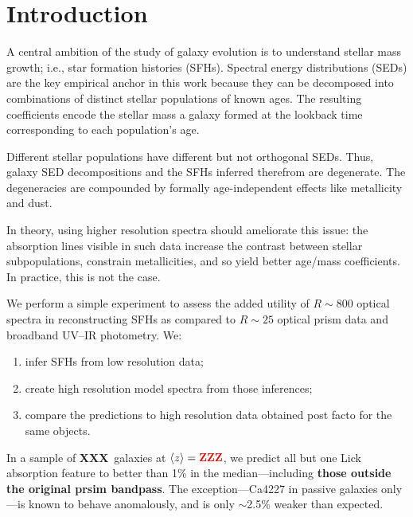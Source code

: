 \documentclass[a4paper,fleqn,usenatbib]{mnras}
\newcommand{\bfr}{\bf\color{red}}
\newcommand{\benum}{\begin{enumerate}}
\newcommand{\eenum}{\end{enumerate}}
\newcommand{\ntot}{{\bfr XXX}} %
\newcommand{\midz}{{\bfr ZZZ}} %
\begin{document}

\section{Introduction}
\label{sec:intro}

A central ambition of the study of galaxy evolution is to understand stellar mass growth; i.e., 
star formation histories (SFHs). Spectral energy distributions (SEDs) are the key empirical anchor 
in this work because they can be decomposed into combinations of distinct stellar populations of 
known ages. The resulting coefficients encode the stellar mass a galaxy formed at the lookback time 
corresponding to each population's age.
	
Different stellar populations have different but not orthogonal SEDs. Thus, galaxy SED decompositions 
and the SFHs inferred therefrom are degenerate. The degeneracies are compounded by 
formally age-independent effects like metallicity and dust. 

In theory, using higher resolution spectra should ameliorate this issue: the absorption lines visible 
in such data increase the contrast between stellar subpopulations, constrain metallicities, and so yield 
better age/mass coefficients. In practice, this is not the case.


We perform a simple experiment to assess the added utility of $R\sim800$ optical spectra in 
reconstructing SFHs as compared to $R\sim25$ optical prism data and broadband UV--IR photometry. 
We:
\benum
	\item infer SFHs from low resolution data;
	\item create high resolution model spectra from those inferences;
	\item compare the predictions to high resolution data obtained post facto for the same
		objects. 
\eenum

In a sample of \ntot\ galaxies at $\langle z\rangle=\midz$, we predict all but one Lick absorption 
feature \citep{Worthey94} to better than 1\% in the median---including 
{\bfr those outside the original prsim bandpass}. The exception---Ca4227 in passive 
galaxies only---is known to behave anomalously, and is only $\sim$2.5\% weaker than expected. 
\end{document}
